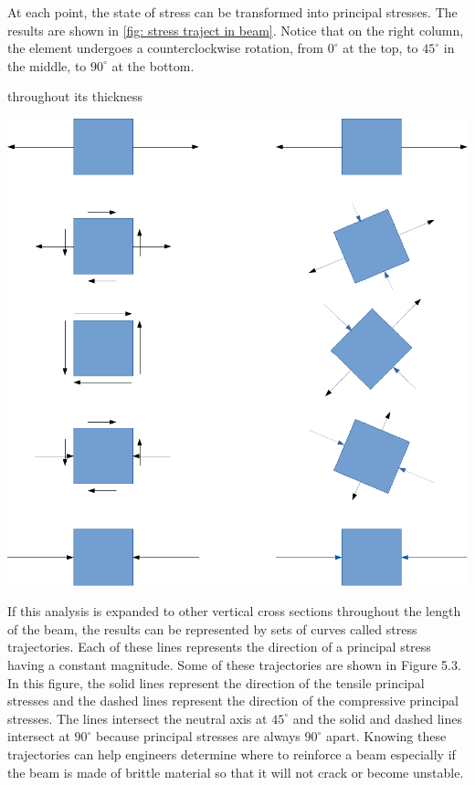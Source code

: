 \documentclass[a4paper,openany,nobib]{tufte-book}
\begin{document}
{{At each point, the state of stress can be transformed into principal
stresses. The results are shown in
\ref{fig: stress traject in beam}. Notice
that on the right column, the element undergoes a counterclockwise
rotation, from \(0^{\circ}\) at the top, to \(45^{\circ}\) in the middle, to
\(90^{\circ}\) at the bottom.


throughout its thickness
\begin{center}
\includegraphics[width=.9\linewidth]{pictures/Simple-load-bearing/stress-traject-beam.pdf}
\label{fig: stress traject in beam}
\end{center}

If this analysis is expanded to other vertical cross sections throughout
the length of the beam, the results can be represented by sets of curves
called stress trajectories. Each of these lines represents the direction
of a principal stress having a constant magnitude. Some of these
trajectories are shown in Figure 5.3. In this figure, the solid lines
represent the direction of the tensile principal stresses and the dashed
lines represent the direction of the compressive principal stresses. The
lines intersect the neutral axis at \(45^{\circ}\) and the solid and dashed
lines intersect at \(90^{\circ}\) because principal stresses are always
\(90^{\circ}\) apart. Knowing these trajectories can help engineers
determine where to reinforce a beam especially if the beam is made of
brittle material so that it will not crack or become unstable.

}}
\end{document}

